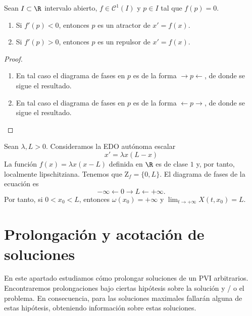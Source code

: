 \documentclass{article}
\begin{document}
\begin{prop}
  Sean $I \subset \R$ intervalo abierto, $f \in \mathcal{C}^1(I)$ y $p\in I$ tal que $f(p) = 0$.
  
  \begin{enumerate}
  \item Si $f'(p) < 0$, entonces $p$ es un atractor de $x' = f(x)$.
  \item Si $f'(p) > 0$, entonces $p$ es un repulsor de $x' = f(x)$.
  \end{enumerate}
\end{prop}
\begin{proof}
  \begin{enumerate}
  \item En tal caso el diagrama de fases en $p$ es de la forma $\rightarrow p \leftarrow$, de donde
    se sigue el resultado.
  \item En tal caso el diagrama de fases en $p$ es de la forma $\leftarrow p \rightarrow$, de donde
    se sigue el resultado. \qedhere
  \end{enumerate}
\end{proof}

\begin{ex}
  Sean $\lambda, L > 0$. Consideramos la EDO autónoma escalar
  \begin{equation}
    \label{eq:log}
    x' = \lambda x(L-x)
  \end{equation}
  La función $f(x) = \lambda x (x -L)$ definida en $\R$ es de clase $1$ y, por tanto, localmente
  lipschitziana. Tenemos que $\mathrm{Z}_f = \{0, L\}$. El diagrama de fases de la ecuación es
  \[-\infty \leftarrow 0 \rightarrow L \leftarrow +\infty.\] Por tanto, si $0 < x_0 < L$, entonces
  $\omega(x_0) = +\infty$ y $\lim_{t \to +\infty} X(t,x_0) = L$.
\end{ex}


\section{Prolongación y acotación de soluciones}

En este apartado estudiamos cómo prolongar soluciones de un PVI arbitrarios. Encontraremos
prolongaciones bajo ciertas hipótesis sobre la solución y / o el problema. En consecuencia, para las
soluciones maximales fallarán alguna de estas hipótesis, obteniendo información sobre estas
soluciones.
\end{document}
